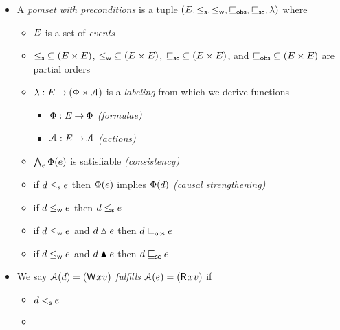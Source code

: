   \begin{itemize}
  \item A \emph{pomset with preconditions} is a tuple
    $(E, {\le_\mathsf{s}}, {\le_\mathsf{w}}, {\sqsubseteq_\mathsf{obs}}, {\sqsubseteq_\mathsf{sc}}, \lambda)$ where
    \begin{itemize}
    \item $E$ is a set of \emph{events}
    \item ${\le_\mathsf{s}} \subseteq (E\times E)$,
      ${\le_\mathsf{w}} \subseteq (E\times E)$, 
      ${\sqsubseteq_\mathsf{sc}} \subseteq (E\times E)$, and
      ${\sqsubseteq_\mathsf{obs}} \subseteq (E\times E)$ are partial orders
    \item $\lambda: E \mathbin\rightarrow (\Phi\times\mathcal{A})$ is a \emph{labeling}
      from which we derive functions
      \begin{itemize}
      \item $\Phi:E\mathbin\rightarrow\Phi$ \emph{(formulae)} %
      \item $\mathcal{A}:E\mathbin\rightarrow\mathcal{A}$  \emph{(actions)} %
      \end{itemize}
    \item $\bigwedge_{e}\Phi(e)$ is satisfiable
      \emph{(consistency)}
    \item if $d\le_\mathsf{s}e$ then $\Phi(e)$ implies
      $\Phi(d)$ \emph{(causal strengthening)}
    \item if $d\le_\mathsf{w}e$ then $d\le_\mathsf{s}e$ 
    \item if $d\le_\mathsf{w}e$ and $d\mathbin{\vartriangle}e$ then $d\sqsubseteq_\mathsf{obs}e$ 
    \item if $d\le_\mathsf{w}e$ and $d\mathbin{\blacktriangle}e$ then $d\sqsubseteq_\mathsf{sc}e$ 
    \end{itemize}
  \item
    We say $\labelingAct(\bEv)=(\DW{x}{v})$ \emph{fulfills} $\labelingAct(\aEv)=(\DR{x}{v})$ if 
    \begin{itemize}
    \item[{\labeltextsc[F3]{(F3)}{rf3}}]
      $d <_\mathsf{s} e$
    \item[{\labeltextsc[F3]{(F3)}{rf3}}]

\end{itemize}
\end{itemize}
